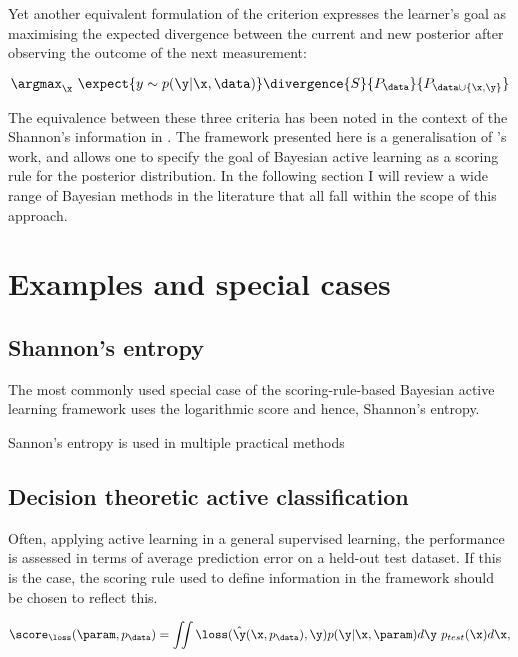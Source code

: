 Yet another equivalent formulation of the criterion expresses the learner's goal as maximising the expected divergence between the current and new posterior after observing the outcome of the next measurement:

\begin{equation}
	\argmax_\x\  \expect{y \sim p(\y\vert \x, \data)}\divergence{S}{P_{\data}}{P_{\data\cup\{\x,\y\}}}
\end{equation}

The equivalence between these three criteria has been noted in the context of the Shannon's information in \citep{MacKay1992}. The framework presented here is a generalisation of \citeauthor{MacKay1992}'s work, and allows one to specify the goal of Bayesian active learning as a scoring rule for the posterior distribution. In the following section I will review a wide range of Bayesian methods in the literature that all fall within the scope of this approach.

\section{Examples and special cases}
\subsection{Shannon's entropy}

The most commonly used special case of the scoring-rule-based Bayesian active learning framework uses the logarithmic score and hence, Shannon's entropy. 

Sannon's entropy is used in multiple practical methods \citep{MacKay1992,Lawrence2004,Krause2006,Ji2008,Settles2010,Houlsby2011,Huszar2012quantum}

\subsection{Decision theoretic active classification}

Often, applying active learning in a general supervised learning, the performance is assessed in terms of average prediction error on a held-out test dataset. If this is the case, the scoring rule used to define information in the framework should be chosen to reflect this.

\begin{equation}
	\score_{\loss}(\param,p_\data) = \iint \loss(\hat{\y}(\x,p_\data),\y) p(\y\vert\x,\param) d\y\ p_{test}(\x) d\x,
\end{equation}

